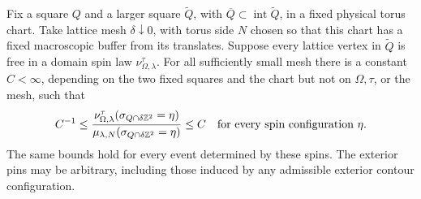 \begin{proposition}
\label{prop:interior-density}
Fix a square \(Q\) and a larger square \(\widetilde Q\), with
\(\overline Q\subset\operatorname{int}\widetilde Q\), in a fixed
physical torus chart.  Take lattice mesh \(\delta\downarrow0\), with
torus side \(N\) chosen so that this chart has a fixed macroscopic
buffer from its translates.  Suppose every lattice vertex in
\(\widetilde Q\) is free in a domain spin law
\(\nu_{\Omega,\lambda}^{\tau}\).  For all sufficiently small mesh there
is a constant \(C<\infty\), depending on the two fixed squares and the
chart but not on \(\Omega,\tau\), or the mesh, such that
\begin{equation}
 C^{-1}\le
 \frac{\nu_{\Omega,\lambda}^{\tau}(\sigma_{Q\cap\delta\mathbb Z^2}=\eta)}
      {\mu_{\lambda,N}(\sigma_{Q\cap\delta\mathbb Z^2}=\eta)}
 \le C
 \quad\text{for every spin configuration }\eta.
 \label{eq:comparison-interior-density}
\end{equation}
The same bounds hold for every event determined by these spins.
The exterior pins may be arbitrary, including those induced by any
admissible exterior contour configuration.
\end{proposition}

